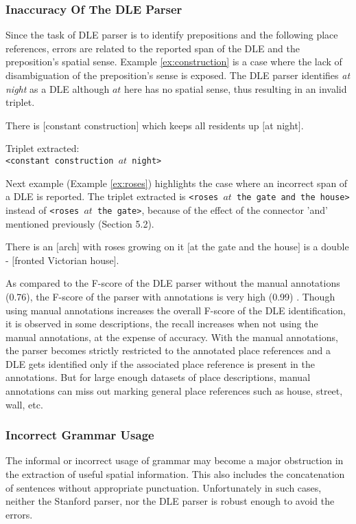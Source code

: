 \documentclass{acm_proc_article-sp}
\begin{document}
\subsubsection{Inaccuracy Of The DLE Parser}
Since the task of DLE parser is to identify prepositions and the following place references, errors are related to the reported span of the DLE and the preposition's spatial sense. Example \ref{ex:construction} is a case where the lack of disambiguation of the preposition's sense is exposed. The DLE parser identifies \textit{at night} as a DLE although $at$ here has no spatial sense, thus resulting in an invalid triplet.
\label{subsub:DLE}
\begin{example}
\label{ex:construction}
There is $[$constant construction$]$ which keeps all residents up $[$at night$]$.
\end{example}
Triplet extracted:\\
\texttt{<constant construction $at$ night>}

Next example (Example \ref{ex:roses}) highlights the case where an incorrect span of a DLE is reported. The triplet extracted is \texttt{<roses $at$ the gate and the house>} instead of \texttt{<roses $at$ the gate>}, because of the effect of the connector 'and' mentioned previously (Section 5.2).
\begin{example}
\label{ex:roses}
There is an $[$arch$]$ with roses growing on it $[$at the gate and the house$]$ is a double - $[$fronted Victorian house$]$.
\end{example}
As compared to the F-score of the DLE parser without the manual annotations (0.76), the F-score of the parser with annotations is very high (0.99) \cite{fei:locative}. 
Though using manual annotations increases the overall F-score of the DLE identification, it is observed in some descriptions, the recall increases when not using the manual annotations, at the expense of accuracy. With the manual annotations, the parser becomes strictly restricted to the annotated place references and a DLE gets identified only if the associated place reference is present in the annotations. But for large enough datasets of place descriptions, manual annotations can miss out marking general place references such as house, street, wall, etc. 

\subsubsection{Incorrect Grammar Usage}
The informal or incorrect usage of grammar may become a major obstruction in the extraction of useful spatial information. This also includes the concatenation of sentences without appropriate punctuation. Unfortunately in such cases, neither the Stanford parser, nor the DLE parser is robust enough to avoid the errors. 
\end{document}
